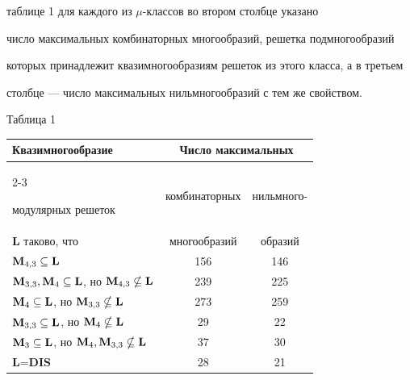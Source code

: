 таблице 1 для каждого из $\mu$-классов во втором столбце указано


число максимальных комбинаторных многообразий, решетка подмногообразий


которых принадлежит квазимногообразиям решеток из этого класса, а в третьем


столбце --- число максимальных нильмногообразий с тем же свойством.


\medskip







\hspace*{110mm}Таблица 1


\begin{center}


\small


\begin{tabular}{|l|c|c|}


\hline


Квазимногообразие & \multicolumn{2}{c|}{Число максимальных}\\


\cline{2-3}


модулярных решеток & комбинаторных & нильмного-\\


{\bf L} таково, что & многообразий & образий\\


\hline


$\bold M_{4,3}\subseteq\bold L$ & 156 & 146\\


\hline


$\bold M_{3,3},\bold M_4\subseteq\bold L$, но $\bold M_{4,3}


\nsubseteq\bold L$ & 239 & 225\\


\hline


$\bold M_4\subseteq\bold L$, но $\bold M_{3,3}\nsubseteq\bold L$ & 273 &


259\\


\hline


$\bold M_{3,3}\subseteq\bold L$, но $\bold M_4\nsubseteq\bold L$ & 29 &


22\\


\hline


$\bold M_3\subseteq\bold L$, но $\bold M_4,\bold M_{3,3}\nsubseteq


\bold L$ & 37 & 30\\


\hline


{\bf L}={\bf{DIS}} & 28 & 21\\


\hline


\end{tabular}




\label{stat}


\end{center}


